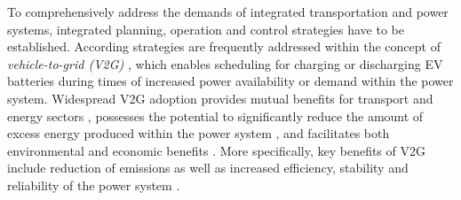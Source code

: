 To comprehensively address the demands of integrated transportation and power systems, integrated planning, operation and control strategies have to be established. According strategies are frequently addressed within the concept of \textit{vehicle-to-grid (V2G)} \cite{lund2008integration}, which enables scheduling for charging or discharging EV batteries during times of increased power availability or demand within the power system. %
Widespread V2G adoption provides mutual benefits for transport and energy sectors \cite{lund2006integrated}, possesses the potential to significantly reduce the amount of excess energy produced within the power system \cite{richardson2013electric}, and facilitates both environmental and economic benefits \cite{faria2012sustainability, mwasilu2014electric}. More specifically, key benefits of V2G include reduction of emissions as well as increased efficiency, stability and reliability of the power system \cite{yilmaz2013review}. 





%
